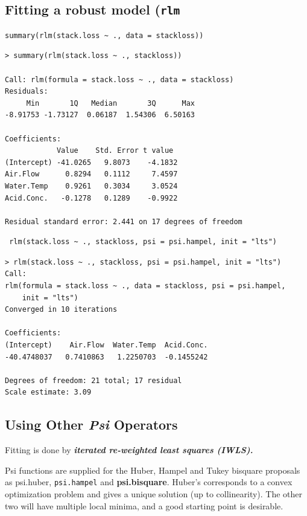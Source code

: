 \documentclass[12pt, a4paper]{article}
\theoremstyle{plain}
\theoremstyle{definition}
\theoremstyle{remark}
\begin{document}
\subsection{Fitting a robust model (\texttt{rlm}}
\begin{framed}
\begin{verbatim}
summary(rlm(stack.loss ~ ., data = stackloss))
\end{verbatim}
\end{framed}
\begin{verbatim}
> summary(rlm(stack.loss ~ ., stackloss))

Call: rlm(formula = stack.loss ~ ., data = stackloss)
Residuals:
     Min       1Q   Median       3Q      Max 
-8.91753 -1.73127  0.06187  1.54306  6.50163 

Coefficients:
            Value    Std. Error t value 
(Intercept) -41.0265   9.8073    -4.1832
Air.Flow      0.8294   0.1112     7.4597
Water.Temp    0.9261   0.3034     3.0524
Acid.Conc.   -0.1278   0.1289    -0.9922

Residual standard error: 2.441 on 17 degrees of freedom
\end{verbatim}
\begin{framed}
\begin{verbatim}
 rlm(stack.loss ~ ., stackloss, psi = psi.hampel, init = "lts")
\end{verbatim}
\end{framed}
\begin{verbatim}
> rlm(stack.loss ~ ., stackloss, psi = psi.hampel, init = "lts")
Call:
rlm(formula = stack.loss ~ ., data = stackloss, psi = psi.hampel, 
    init = "lts")
Converged in 10 iterations

Coefficients:
(Intercept)    Air.Flow  Water.Temp  Acid.Conc. 
-40.4748037   0.7410863   1.2250703  -0.1455242 

Degrees of freedom: 21 total; 17 residual
Scale estimate: 3.09 
\end{verbatim}
\subsection{Using Other \textit{Psi} Operators}

Fitting is done by \textbf{\emph{iterated re-weighted least squares (IWLS).}}

Psi functions are supplied for the Huber, Hampel and Tukey bisquare proposals as psi.huber, \texttt{psi.hampel} and \textbf{psi.bisquare}. Huber's corresponds to a convex optimization problem and gives a unique solution (up to collinearity). The other two will have multiple local minima, and a good starting point is desirable.
\end{document}
